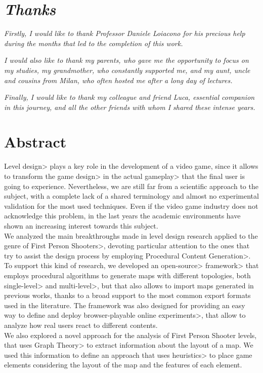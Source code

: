 \chapter{\textit{Thanks}}

\indent 

\textit{Firstly, I would like to thank Professor Daniele Loiacono for his precious help during the months that led to the completion of this work.}

\par \mbox{}

\textit{I would also like to thank my parents, who gave me the opportunity to focus on my studies, my grandmother, who constantly supported me, and my aunt, uncle and cousins from Milan, who often hosted me after a long day of lectures.}

\par \mbox{}

\textit{Finally, I would like to thank my colleague and friend Luca, essential companion in this journey, and all the other friends with whom I shared these intense years.}

\par \mbox{}

\textit{}

\chapter{Abstract}

\<Level design> plays a key role in the development of a video game, since it allows to transform the \<game design> in the actual \<gameplay> that the final user is going to experience. Nevertheless, we are still far from a scientific approach to the subject, with a complete lack of a shared terminology and almost no experimental validation for the most used techniques. Even if the video game industry does not acknowledge this problem, in the last years the academic environments have shown an increasing interest towards this subject. \\
We analyzed the main breakthroughs made in level design research applied to the genre of \<First Person Shooters>, devoting particular attention to the ones that try to assist the design process by employing \<Procedural Content Generation>. To support this kind of research, we developed an \<open-source> \<framework> that employs procedural algorithms to generate maps with different topologies, both \<single-level> and \<multi-level>, but that also allows to import maps generated in previous works, thanks to a broad support to the most common export formats used in the literature. The framework was also designed for providing an easy way to define and deploy \<browser-playable online experiments>, that allow to analyze how real users react to different contents. \\
We also explored a novel approach for the analysis of First Person Shooter levels, that uses \<Graph Theory> to extract information about the layout of a map. We used this information to define an approach that uses \<heuristics> to place game elements considering the layout of the map and the features of each element.

